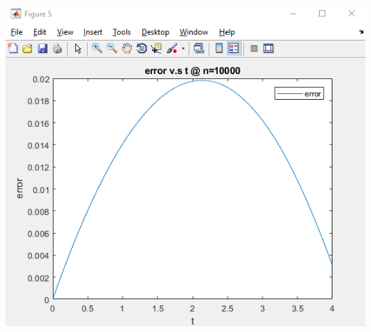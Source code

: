 \documentclass[12pt]{article}
\begin{document}
\begin{enumerate}
\begin{center}
		\includegraphics[scale=0.8]{p5}
	\end{center} 
	
	\end{enumerate}
	
	
	
\end{document}
